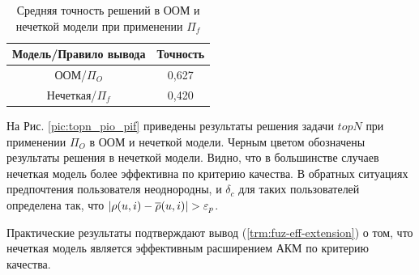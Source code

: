 \begin{table}[H]
	\caption{Средняя точность решений в ООМ и нечеткой модели при применении
	$\Pi_f$}
  \begin{center}
	\label{tbl:topn_fuz}
	\begin{tabular}{|c|c|}
	  \hline
		Модель/Правило вывода & Точность \\ \hline
		ООМ/$\Pi_{O}$&0,627 \\ \hline
		Нечеткая/$\Pi_{f}$&0,420 \\ \hline
	\end{tabular}
  \end{center}
\end{table}


На Рис. \ref{pic:topn_pio_pif} приведены результаты решения
задачи $topN$ при применении $\Pi_O$ в ООМ и нечеткой модели.
Черным цветом обозначены результаты решения в нечеткой модели.
Видно, что в большинстве случаев нечеткая модель более эффективна
по критерию качества. В обратных ситуациях предпочтения пользователя
неоднородны, и $\delta_c$ для таких пользователей определена так, что
$|\rho(u, i) - \overline{\rho}(u, i)| > \varepsilon_p$.

Практические результаты подтверждают вывод (\ref{trm:fuz-eff-extension}) о том,
что нечеткая модель является эффективным расширением АКМ по критерию качества.

